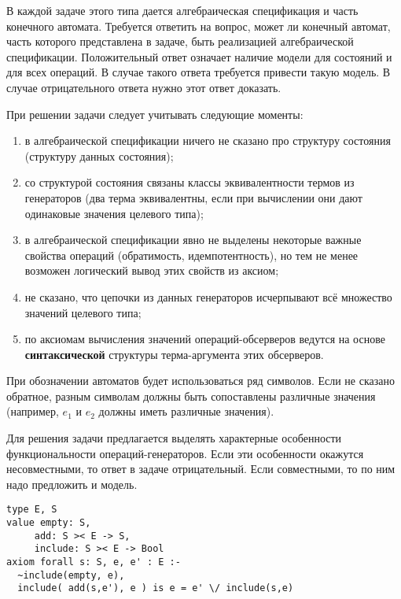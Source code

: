 

В каждой задаче этого типа дается алгебраическая спецификация и часть конечного автомата. Требуется ответить на вопрос, может ли конечный автомат, часть которого представлена в задаче, быть реализацией алгебраической спецификации. Положительный ответ означает наличие модели для состояний и для всех операций. В случае такого ответа требуется привести такую модель. В случае отрицательного ответа нужно этот ответ доказать.

При решении задачи следует учитывать следующие моменты:
\begin{enumerate}
\item в алгебраической спецификации ничего не сказано про структуру состояния (структуру данных состояния);
\item со структурой состояния связаны классы эквивалентности термов из генераторов (два терма эквивалентны, если при вычислении они дают одинаковые значения целевого типа);
\item в алгебраической спецификации явно не выделены некоторые важные свойства операций (обратимость, идемпотентность), но тем не менее возможен логический вывод этих свойств из аксиом;
\item не сказано, что цепочки из данных генераторов исчерпывают всё множество значений целевого типа;
\item по аксиомам вычисления значений операций-обсерверов ведутся на основе \textbf{синтаксической} структуры терма-аргумента этих обсерверов.
\end{enumerate}

При обозначении автоматов будет использоваться ряд символов. Если не сказано обратное, разным символам должны быть сопоставлены различные значения (например, $e_1$ и $e_2$ должны иметь различные значения).

Для решения задачи предлагается выделять характерные особенности функциональности операций-генераторов. Если эти особенности окажутся несовместными, то ответ в задаче отрицательный. Если совместными, то по ним надо предложить и модель.

\z \begin{lstlisting}
type E, S
value empty: S,
     add: S >< E -> S,
     include: S >< E -> Bool
axiom forall s: S, e, e' : E :-
  ~include(empty, e),
  include( add(s,e'), e ) is e = e' \/ include(s,e)
\end{lstlisting}


